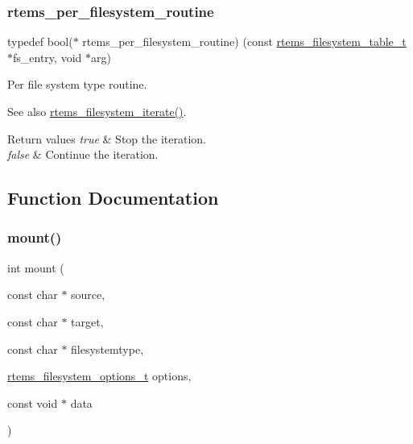 \subsubsection{\texorpdfstring{rtems\_per\_filesystem\_routine}{rtems\_per\_filesystem\_routine}}
{\footnotesize\ttfamily typedef bool($\ast$ rtems\+\_\+per\+\_\+filesystem\+\_\+routine) (const \mbox{\hyperlink{structrtems__filesystem__table__t}{rtems\+\_\+filesystem\+\_\+table\+\_\+t}} $\ast$fs\+\_\+entry, void $\ast$arg)}



Per file system type routine. 

\begin{DoxySeeAlso}{See also}
\mbox{\hyperlink{group__FileSystemTypesAndMount_ga27b530006418803c3888d8bfd1c3949a}{rtems\+\_\+filesystem\+\_\+iterate()}}.
\end{DoxySeeAlso}

\begin{DoxyRetVals}{Return values}
{\em true} & Stop the iteration. \\
\hline
{\em false} & Continue the iteration. \\
\hline
\end{DoxyRetVals}


\subsection{Function Documentation}
\mbox{\label{group__FileSystemTypesAndMount_gaf3c1bed49bb0f3dec88d330b4f88d48b}} 
\subsubsection{\texorpdfstring{mount()}{mount()}}
{\footnotesize\ttfamily int mount (\begin{DoxyParamCaption}\item[{const char $\ast$}]{source,  }\item[{const char $\ast$}]{target,  }\item[{const char $\ast$}]{filesystemtype,  }\item[{\mbox{\hyperlink{group__FileSystemTypesAndMount_gabb3a23ee6b6e7aacb719a1a81716af7a}{rtems\+\_\+filesystem\+\_\+options\+\_\+t}}}]{options,  }\item[{const void $\ast$}]{data }\end{DoxyParamCaption})}



